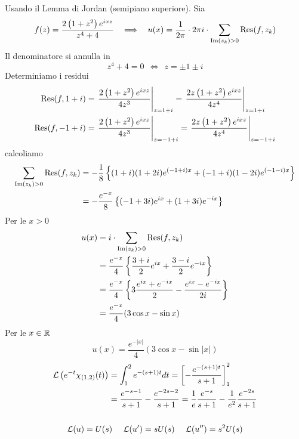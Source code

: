 Usando il Lemma di Jordan (semipiano superiore). Sia
\begin{equation*}
f(z) = \frac{2\left(1 + z^{2}\right) e^{ixz}}{z^{4} + 4} \ \ \implies \ \ u(x) = \frac{1}{2\pi} \cdot 2\pi i \cdot \sum_{\operatorname{Im} (z_{k}) > 0}\operatorname{Res} (f, z_{k})
\end{equation*}
Il denominatore si annulla in
\begin{equation*}
z^{4} + 4 = 0\ \ \iff \ \ z = \pm 1\pm i
\end{equation*}
Determiniamo i residui
\begin{align*}
\operatorname{Res} (f, 1 + i) & = \left. \frac{2\left(1 + z^{2}\right) e^{ixz}}{4z^{3}}\right|_{z = 1 + i} = \left. \frac{2z\left(1 + z^{2}\right) e^{ixz}}{4z^{4}}\right|_{z = 1 + i}\\
\operatorname{Res} (f, - 1 + i) & = \left. \frac{2\left(1 + z^{2}\right) e^{ixz}}{4z^{3}}\right|_{z = -1 + i} = \left. \frac{2z\left(1 + z^{2}\right) e^{ixz}}{4z^{4}}\right|_{z = -1 + i}
\end{align*}
calcoliamo
\begin{align*}
\sum_{\operatorname{Im} (z_{k}) > 0}\operatorname{Res} (f, z_{k}) & = - \frac{1}{8}\left\{(1 + i)(1 + 2i) e^{(- 1 + i) x} + (- 1 + i)(1 - 2i) e^{(- 1 - i) x}\right\}\\
 & = - \frac{e^{- x}}{8}\left\{(- 1 + 3i) e^{ix} + (1 + 3i) e^{- ix}\right\}
\end{align*}
Per le $x > 0$
\begin{align*}
u(x) & = i \cdot \sum_{\operatorname{Im} (z_{k}) > 0}\operatorname{Res} (f, z_{k})\\
 & = \frac{e^{- x}}{4}\left\{\frac{3 + i}{2} e^{ix} + \frac{3 - i}{2} e^{- ix}\right\}\\
 & = \frac{e^{- x}}{4}\left\{3\frac{e^{ix} + e^{- ix}}{2} - \frac{e^{ix} - e^{- ix}}{2i}\right\}\\
 & = \frac{e^{- x}}{4}(3\cos x - \sin x)
\end{align*}
Per le $x\in \mathbb{R} $
\begin{equation*}
u(x) = \frac{e^{- | x|}}{4}(3\cos x - \sin| x|)
\end{equation*}
\Soluzione
\begin{gather*}
\begin{aligned}
\mathcal{L}\left(e^{- t} \chi_{(1, 2)}(t)\right) & = \int^{2}_{1} e^{- (s + 1) t} dt = \left[ - \frac{e^{- (s + 1) t}}{s + 1}\right]^{2}_{1}\\
 & = \frac{e^{- s - 1}}{s + 1} - \frac{e^{- 2s - 2}}{s + 1} = \frac{1}{e}\frac{e^{- s}}{s + 1} - \frac{1}{e^{2}}\frac{e^{- 2s}}{s + 1}
\end{aligned}\\
\\
\mathcal{L}(u) = U(s) \ \ \ \ \mathcal{L}(u') = sU(s) \ \ \ \ \mathcal{L}(u'') = s^{2} U(s)
\end{gather*}
